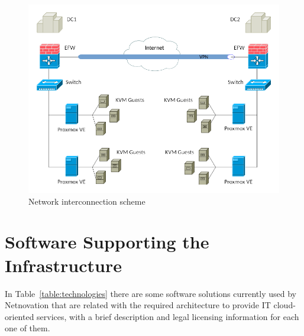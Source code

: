\documentclass[a4paper, 12pt]{book}
\begin{document}
\begin{figure}[H]
  \centering
  \includegraphics[scale=0.50]{network_scheme.png}
  \caption[Network interconnection scheme]{Network interconnection scheme}
  \label{fig:network}
\end{figure}


\section{Software Supporting the Infrastructure}
\label{sec:software}

In Table~\ref{table:technologies} there are some software solutions currently used by Netnovation that are related with the required architecture to provide IT cloud-oriented services, with a brief description and legal licensing information for each one of them.
\end{document}
